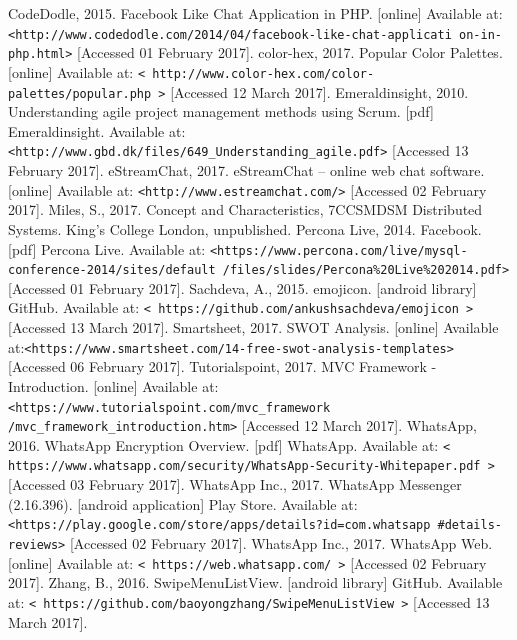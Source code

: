 \documentclass{article}
\begin{document}
\begin{thebibliography}{12}
CodeDodle, 2015. Facebook Like Chat Application in PHP. [online] Available at: \texttt{<http://www.codedodle.com/2014/04/facebook-like-chat-applicati
on-in-php.html>} [Accessed 01 February 2017].
color-hex, 2017. Popular Color Palettes. [online] Available at: \texttt{< http://www.color-hex.com/color-palettes/popular.php >} [Accessed 12 March 2017]. 
Emeraldinsight, 2010. Understanding agile project management methods using Scrum. [pdf] Emeraldinsight. Available at: \texttt{<http://www.gbd.dk/files/649\_{}Understanding\_{}agile.pdf>} [Accessed 13 February 2017].
eStreamChat, 2017. eStreamChat – online web chat software. [online] Available at: \texttt{<http://www.estreamchat.com/>} [Accessed 02 February 2017]. 
Miles, S., 2017. Concept and Characteristics, 7CCSMDSM Distributed Systems. King’s College London, unpublished.
Percona Live, 2014. Facebook. [pdf] Percona Live. Available at: \texttt{<https://www.percona.com/live/mysql-conference-2014/sites/default
/files/slides/Percona\%{}20Live\%{}202014.pdf>} [Accessed 01 February 2017]. 
Sachdeva, A., 2015. emojicon. [android library] GitHub. Available at: \texttt{< https://github.com/ankushsachdeva/emojicon >} [Accessed 13 March 2017]. 
Smartsheet, 2017. SWOT Analysis. [online] Available at:\texttt{<https://www.smartsheet.com/14-free-swot-analysis-templates>}
[Accessed 06 February 2017].
Tutorialspoint, 2017. MVC Framework - Introduction. [online] Available at: \texttt{<https://www.tutorialspoint.com/mvc\_{}framework
/mvc\_{}framework\_{}introduction.htm>} [Accessed 12 March 2017].
WhatsApp, 2016. WhatsApp Encryption Overview. [pdf] WhatsApp. Available at: \texttt{< https://www.whatsapp.com/security/WhatsApp-Security-Whitepaper.pdf >} [Accessed 03 February 2017].  
WhatsApp Inc., 2017. WhatsApp Messenger (2.16.396). [android application] Play Store. Available at: \texttt{<https://play.google.com/store/apps/details?id=com.whatsapp
\#{}details-reviews>} [Accessed 02 February 2017]. 
WhatsApp Inc., 2017. WhatsApp Web. [online] Available at: \texttt{< https://web.whatsapp.com/ >} [Accessed 02 February 2017]. 
Zhang, B., 2016. SwipeMenuListView. [android library] GitHub. Available at: \texttt{< https://github.com/baoyongzhang/SwipeMenuListView >} [Accessed 13 March 2017]. 
\end{thebibliography}
\end{document}
